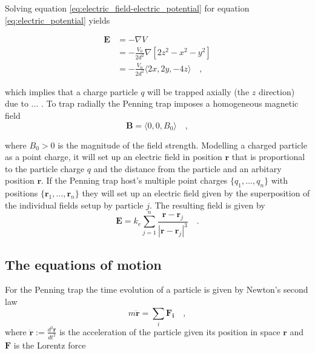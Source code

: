 \documentclass[../main_proj3.tex]{subfiles}
\begin{document}
Solving equation \eqref{eq:electric_field-electric_potential} for equation \eqref{eq:electric_potential} yields

\begin{equation}
\label{eq:solved_electric_field}
\begin{split}
\mathbf{E} & = - \nabla V \quad \\
& = - \frac{V_0}{2d^{2}} \nabla \left[2z^{2}-x^{2}-y^{2}\right] \\
& = - \frac{V_0}{2d^{2}} 
\bigl\langle 
2x, 2y, -4z
\bigr\rangle \quad ,
\end{split}
\end{equation}

which implies that a charge particle $q$ will be trapped axially (the $z$ direction) due to ... . To trap radially the Penning trap imposes a homogeneous magnetic field 
\begin{equation}
\label{eq:magnetic_field}
\mathbf{B} = \bigl\langle 
0, 0, B_0
\bigr\rangle \quad ,
\end{equation}

where $B_0 > 0$ is the magnitude of the field strength. Modelling a charged particle as a point charge, it will set up an electric field in position $\mathbf{r}$ that is proportional to the particle charge $q$ and the distance from the particle and an arbitary position $\mathbf{r}$. If the Penning trap host's multiple point charges $\{q_1, \dots, q_n\}$ with positions $\{\mathbf{r}_1, \dots, \mathbf{r}_n\}$ they will set up an electric field given by the superposition of the individual fields setup by particle $j$. The resulting field is given by 
\begin{equation}
\label{eq:electric_field_particles}
\mathbf{E} = k_e \sum\limits_{j=1}^n \frac{\mathbf{r}-\mathbf{r}_j}{|\mathbf{r}-\mathbf{r}_j|^{3}} \quad.
\end{equation}


\subsection{The equations of motion}

For the Penning trap the time evolution of a particle is given by Newton's second law 
\begin{equation}
\label{eq:newtons_second_law_Penning_trap}
m \mathbf{\ddot{r}}  = \sum_i \mathbf{F_i} \quad ,
\end{equation}
where $\mathbf{\ddot{r}}:=\frac{d^{2}\mathbf{r}}{dt^{2}}$ is the acceleration of the particle given its position in space $\mathbf{r}$ and $\mathbf{F}$ is the Lorentz force
\end{document}
